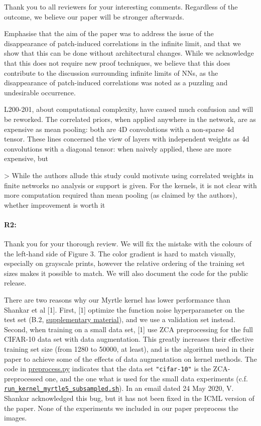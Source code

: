 \documentclass{article}
\begin{document}
Thank you to all reviewers for your interesting comments. Regardless of the outcome, we believe our paper will be stronger afterwards.

Emphasise that the aim of the paper was to address the issue of the
disappearance of patch-induced correlations in the infinite limit, and that we
show that this can be done without architectural changes. While we acknowledge
that this does not require new proof techniques, we believe that this does
contribute to the discussion surrounding infinite limits of NNs, as the
disappearance of patch-induced correlations was noted as a puzzling and
undesirable occurrence.

L200-201, about computational complexity, have caused much confusion and will be reworked. The correlated priors, when applied anywhere in the network, are as expensive as mean pooling: both are 4D convolutions with a non-sparse 4d tensor. These lines concerned the view of layers with independent weights as 4d convolutions with a diagonal tensor: when naively applied, these are more expensive, but

> While the authors allude this study could motivate using correlated weights in finite networks no analysis or support is given. For the kernels, it is not clear with more computation required than mean pooling (as claimed by the authors), whether improvement is worth it

\paragraph{R2:}
Thank you for your thorough review. We will fix the mistake with the colours of the left-hand side of Figure 3. The color gradient is hard to match visually, especially on grayscale prints, however the relative ordering of the training set sizes makes it possible to match. We will also document the code for the public release.

There are two reasons why our Myrtle kernel has lower performance than Shankar
et al [1]. First, [1] optimize the function noise hyperparameter on the test set
(B.2,
\href{https://proceedings.icml.cc/book/2020/file/6950aa02ae8613af620668146dd11840-Supplemental.pdf}{supplementary material}), and we use a validation set instead. Second, when training on a
small data set, [1] use ZCA preprocessing for the full CIFAR-10 data set with
data augmentation. This greatly increases their effective training set size
(from 1280 to 50000, at least), and is the algorithm used in their paper to
achieve some of the effects of data augmentation on kernel methods. The code in
\href{https://github.com/modestyachts/neural_kernels_code/blob/master/preprocess.py}{preprocess.py}
indicates that the data set \verb|"cifar-10"| is the ZCA-preprocessed one, and
the one what is used for the small data experiments (c.f.
\href{https://github.com/modestyachts/neural_kernels_code/blob/master/subsampled_cifar10/run_kernel_myrtle5_subsampled.sh}{\texttt{run\_kernel\_myrtle5\_subsampled.sh}}).
In an email dated 24 May 2020, V. Shankar acknowledged this bug, but it has not
been fixed in the ICML version of the paper. None of the experiments we included
in our paper preprocess the images.
\end{document}

